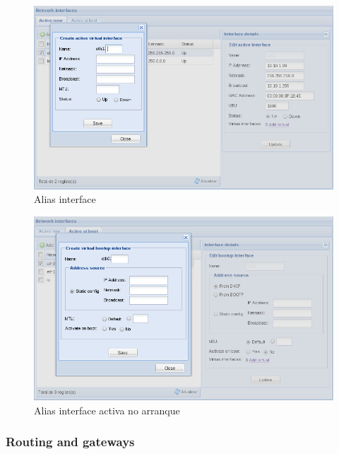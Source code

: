 \begin{figure}[H]
    \begin{center}
    \includegraphics[scale=0.38]{screenshots/etfw/etfw_network_interfaces_03.png}
    \caption{Alias interface}
    \label{fig:etfw_network_interfaces_02}
    \end{center}
\end{figure}

\begin{figure}[H]
    \begin{center}
    \includegraphics[scale=0.38]{screenshots/etfw/etfw_network_interfaces_04.png}
    \caption{Alias interface activa no arranque}
    \label{fig:etfw_network_interfaces_02}
    \end{center}
\end{figure}

\subsubsection{Routing and gateways}

